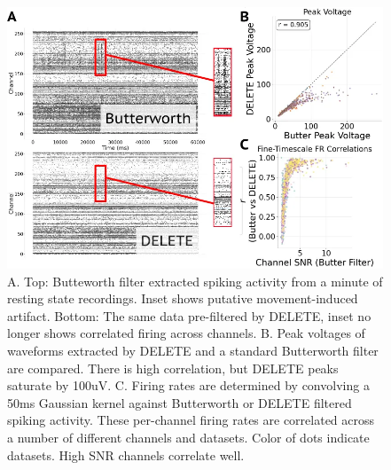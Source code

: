 \documentclass[12pt,oneside]{report}
\begin{document}
\begin{figure}[h]
  \centering
  \includegraphics[width=0.5\linewidth]{ch4_delete_generic.png}
  \caption{A. Top: Butteworth filter extracted spiking activity from a minute of resting state recordings. Inset shows putative movement-induced artifact. Bottom: The same data pre-filtered by DELETE, inset no longer shows correlated firing across channels. B. Peak voltages of waveforms extracted by DELETE and a standard Butterworth filter are compared. There is high correlation, but DELETE peaks saturate by 100uV. C. Firing rates are determined by convolving a 50ms Gaussian kernel against Butterworth or DELETE filtered spiking activity. These per-channel firing rates are correlated across a number of different channels and datasets. Color of dots indicate datasets. High SNR channels correlate well.}
  \label{fig:delete_generic}
\end{figure}
\end{document}
